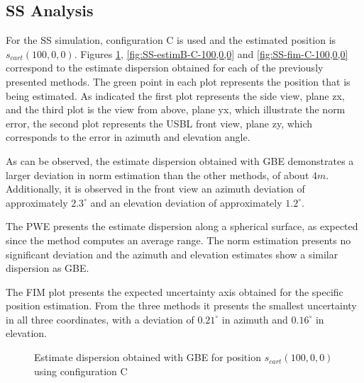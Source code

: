 \subsection{SS Analysis}

For the SS simulation, configuration C is used and the estimated position is $s_{cart}(100,0,0)$. Figures \ref{fig:SS-estimA-C-100,0,0}, \ref{fig:SS-estimB-C-100,0,0} and \ref{fig:SS-fim-C-100,0,0} correspond to the estimate dispersion obtained for each of the previously presented methods. The green point in each plot represents the position that is being estimated. As indicated the first plot represents the side view, plane zx, and the third plot is the view from above, plane yx, which illustrate the norm error, the second plot represents the USBL front view, plane zy, which corresponds to the error in azimuth and elevation angle.

As can be observed, the estimate dispersion obtained with GBE demonstrates a larger deviation in norm estimation than the other methods, of about $4m$. Additionally, it is observed in the front view an azimuth deviation of approximately $2.3^{\circ}$ and an elevation deviation of approximately $1.2^{\circ}$.

The PWE presents the estimate dispersion along a spherical surface, as expected since the method computes an average range. The norm estimation presents no significant deviation and the azimuth and elevation estimates show a similar dispersion as GBE.

The FIM plot presents the expected uncertainty axis obtained for the specific position estimation. From the three methods it presents the smallest uncertainty in all three coordinates, with a deviation of $0.21^{\circ}$ in azimuth and $0.16^{\circ}$ in elevation.

\begin{figure}[!htbp]
	\captionsetup{justification=centering,margin=2cm}
	\caption{Estimate dispersion obtained with GBE for position $s_{cart}(100,0,0)$ using configuration C}
	\label{fig:SS-estimA-C-100,0,0}
\end{figure}

